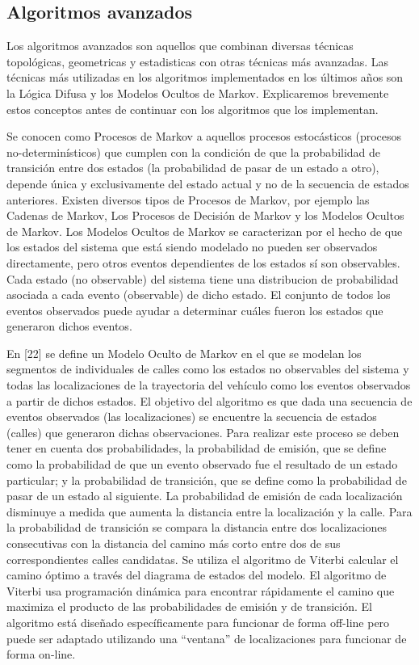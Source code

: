 
\subsection{Algoritmos avanzados}

Los algoritmos avanzados son aquellos que combinan diversas técnicas topológicas, geometricas y estadisticas con otras técnicas más avanzadas. Las técnicas más utilizadas en los algoritmos implementados en los últimos años son la Lógica Difusa y los Modelos Ocultos de Markov. Explicaremos brevemente estos conceptos antes de continuar con los algoritmos que los implementan.

Se conocen como Procesos de Markov a aquellos procesos estocásticos (procesos no-determinísticos) que cumplen con la condición de que la probabilidad de transición entre dos estados (la probabilidad de pasar de un estado a otro), depende única y exclusivamente del estado actual y no de la secuencia de estados anteriores. Existen diversos tipos de Procesos de Markov, por ejemplo las Cadenas de Markov, Los Procesos de Decisión de Markov y los Modelos Ocultos de Markov. Los Modelos Ocultos de Markov se caracterizan por el hecho de que los estados del sistema  que está siendo modelado no pueden ser observados directamente, pero otros eventos dependientes de los estados sí son observables. Cada estado (no observable) del sistema tiene una distribucion de probabilidad asociada a cada evento (observable) de dicho estado. El conjunto de todos los eventos observados puede ayudar a determinar cuáles fueron los estados que generaron dichos eventos.

En [22] se define un Modelo Oculto de Markov en el que se modelan los segmentos de individuales de calles como los estados no observables del sistema y todas las localizaciones de la trayectoria del vehículo como los eventos observados a partir de dichos estados. El objetivo del algoritmo es que dada una secuencia de eventos observados (las localizaciones) se encuentre la secuencia de estados (calles) que generaron dichas observaciones. Para realizar este proceso se deben tener en cuenta dos probabilidades, la probabilidad de emisión, que se define como la probabilidad de que un evento observado fue el resultado de un estado particular; y la probabilidad de transición, que se define como la probabilidad de pasar de un estado al siguiente. La probabilidad de emisión de cada localización disminuye a medida que aumenta la distancia entre la localización y la calle. Para la probabilidad de transición se compara la distancia entre dos localizaciones consecutivas con la distancia del camino más corto entre dos de sus correspondientes calles candidatas. Se utiliza el algoritmo de Viterbi calcular el camino óptimo a través del diagrama de estados del modelo. El algoritmo de Viterbi usa programación dinámica para encontrar rápidamente el camino que maximiza el producto de las probabilidades de emisión y de transición. El algoritmo está diseñado específicamente para funcionar de forma off-line pero puede ser adaptado utilizando una “ventana” de localizaciones para funcionar de forma on-line.

